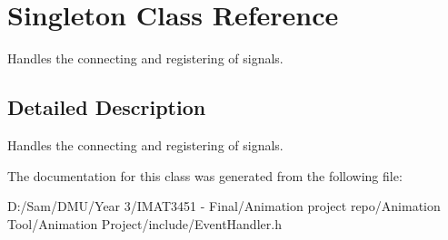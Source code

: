 \hypertarget{class_singleton}{}\section{Singleton Class Reference}
\label{class_singleton}


Handles the connecting and registering of signals.  




\subsection{Detailed Description}
Handles the connecting and registering of signals. 

The documentation for this class was generated from the following file\+:\begin{DoxyCompactItemize}
\item 
D\+:/\+Sam/\+D\+M\+U/\+Year 3/\+I\+M\+A\+T3451 -\/ Final/\+Animation project repo/\+Animation Tool/\+Animation Project/include/Event\+Handler.\+h\end{DoxyCompactItemize}
